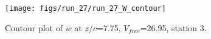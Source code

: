 \begin{figure}[H]
\centering
\texttt{[image: figs/run\_27/run\_27\_W\_contour]}
\caption{Contour plot of $\overline{w}$ at $z/c$=7.75, $V_{free}$=26.95, station 3.}
\label{fig:run_27_W_contour}
\end{figure}


